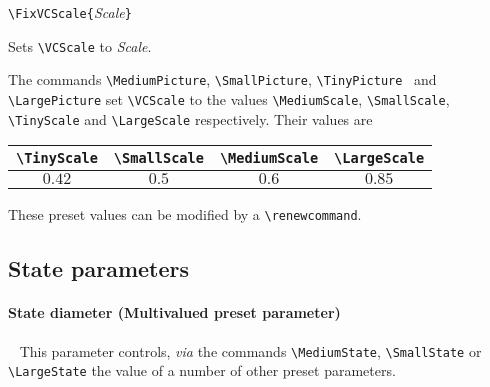 \documentclass[11pt,twoside]{article}
\newlength{\ColoText}%
\newlength{\ColoFigu}%
\newlength{\parindenttemp} %
\newcommand{\noi}{\noindent}
\newcommand{\via}{{\itshape via}\xspace }
\newlength{\jsIndent}%
\begin{document}
\noi 
\hspace*{-\jsIndent}
\begin{minipage}[t]{\ColoText}
        \par\vspace*{0mm}%
        \footnotesize
\verb+\FixVCScale{+\textsl{Scale}\verb+}+
   \end{minipage}%
\hspace*{1.2em}%
\begin{minipage}[t]{\ColoFigu}%
\par\vspace*{0mm}%
Sets \verb+\VCScale+ to \textsl{Scale}.
\end{minipage}%

\medskip 
\noi 
The commands 
\verb+\MediumPicture+, \verb+\SmallPicture+, \verb+\TinyPicture+ \ 
and \verb+\LargePicture+ set  \verb+\VCScale+ to the values
\verb+\MediumScale+, \verb+\SmallScale+, \verb+\TinyScale+
and \verb+\LargeScale+ respectively.
Their values are
\begin{center}
\begin{tabular}{|c|c|c|c|}
\verb+\TinyScale+ & \verb+\SmallScale+ & \verb+\MediumScale+ & 
\verb+\LargeScale+\\ 
\hline
$0.42$ & $0.5$ &  $0.6$ & $0.85$ \\
\hline
\end{tabular}
\end{center}

These preset values can be modified by a \verb+\renewcommand+.



\subsection{State parameters}\label{sec.sta-par}

\paragraph{State diameter {\rm(Multivalued preset parameter)}}
~
This parameter controls, \via the commands 
\verb+\MediumState+, \verb+\SmallState+ 
or \verb+\LargeState+ the value of a number of other preset parameters.
\end{document}

